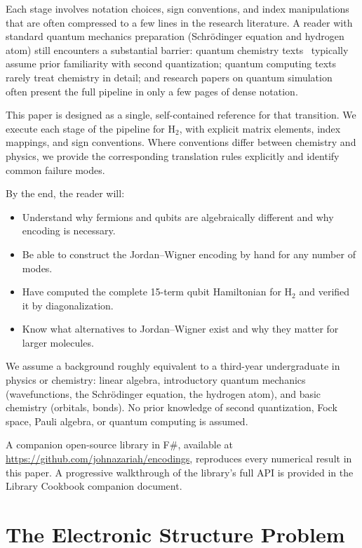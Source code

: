 \documentclass[aps,prb,preprint,longbibliography,nofootinbib]{revtex4-2}
\begin{document}
Each stage involves notation choices, sign conventions, and index
manipulations that are often compressed to a few lines in the research
literature.  A reader with standard quantum mechanics preparation
(Schr\"odinger equation and hydrogen atom) still encounters a substantial
barrier: quantum chemistry texts~\cite{szabo1996,helgaker2000} typically
assume prior familiarity with second quantization; quantum computing
texts~\cite{nielsen2010} rarely treat chemistry in detail; and research
papers on quantum simulation~\cite{omalley2016,whitfield2011} often
present the full pipeline in only a few pages of dense notation.

This paper is designed as a single, self-contained reference for that
transition.  We execute each stage of the pipeline for H$_2$, with
explicit matrix elements, index mappings, and sign conventions.
Where conventions differ between chemistry and physics, we provide the
corresponding translation rules explicitly and identify common failure
modes.

By the end, the reader will:
\begin{itemize}
  \item Understand why fermions and qubits are algebraically different
    and why encoding is necessary.
  \item Be able to construct the Jordan--Wigner encoding by hand for any
    number of modes.
  \item Have computed the complete 15-term qubit Hamiltonian for H$_2$
    and verified it by diagonalization.
  \item Know what alternatives to Jordan--Wigner exist and why they
    matter for larger molecules.
\end{itemize}

We assume a background roughly equivalent to a third-year undergraduate
in physics or chemistry: linear algebra, introductory quantum mechanics
(wavefunctions, the Schr\"odinger equation, the hydrogen atom), and
basic chemistry (orbitals, bonds).  No prior knowledge of second
quantization, Fock space, Pauli algebra, or quantum computing is
assumed.

A companion open-source library in F\#, available at
\url{https://github.com/johnazariah/encodings}, reproduces every
numerical result in this paper.  A progressive walkthrough of the
library's full API is provided in the Library Cookbook companion
document.

\section{The Electronic Structure Problem}
\label{sec:electronic-structure}
\end{document}
